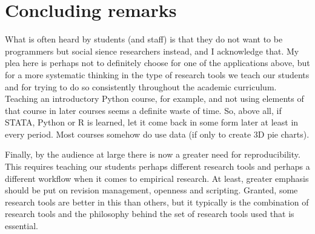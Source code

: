 \documentclass[fleqn,10pt]{SelfArx} %
\begin{document}
\section*{Concluding remarks}

What is often heard by students (and staff) is that they do not want to be programmers but social sience researchers instead, and I acknowledge that. My plea here is perhaps not to definitely choose for one of the applications above, but for a more systematic thinking in the type of research tools we teach our students and for trying to do so consistently throughout the academic curriculum. Teaching an introductory Python course, for example, and not using elements of that course in later courses seems a definite waste of time. So, above all, if STATA, Python or R is learned, let it come back in some form later at least in every period. Most courses somehow do use data (if only to create 3D pie charts).

Finally, by the audience at large there is now a greater need for reproducibility. This requires teaching our students perhaps different research tools and perhaps a different workflow when it comes to empirical research. At least, greater emphasis should be put on revision management, openness and scripting. Granted, some research tools are better in this than others, but it typically is the combination of research tools and the philosophy behind the set of research tools used that is essential.


\printbibliography

\end{document}
